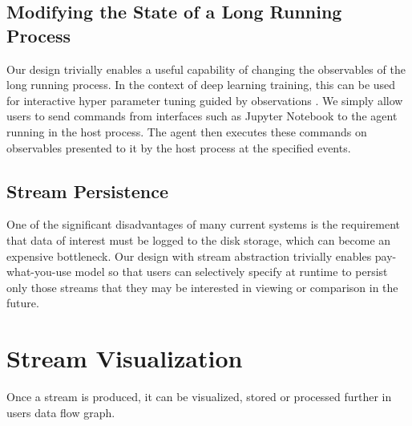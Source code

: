 \documentclass[sigchi]{acmart} %
\begin{document}
\subsection{Modifying the State of a Long Running Process}
Our design trivially enables a useful capability of changing the observables of the long running process. In the context of deep learning training, this can be used for interactive hyper parameter tuning guided by observations \cite{NIPS2011_4443}. We simply allow users to send commands from interfaces such as Jupyter Notebook to the agent running in the host process. The agent then executes these commands on observables presented to it by the host process at the specified events.

\subsection{Stream Persistence}
One of the significant disadvantages of many current systems is the requirement that data of interest must be logged to the disk storage, which can become an expensive bottleneck. Our design with stream abstraction trivially enables pay-what-you-use model so that users can selectively specify at runtime to persist only those streams that they may be interested in viewing or comparison in the future.

\section{Stream Visualization}
Once a stream is produced, it can be visualized, stored or processed further in users data flow graph. 
\end{document}
